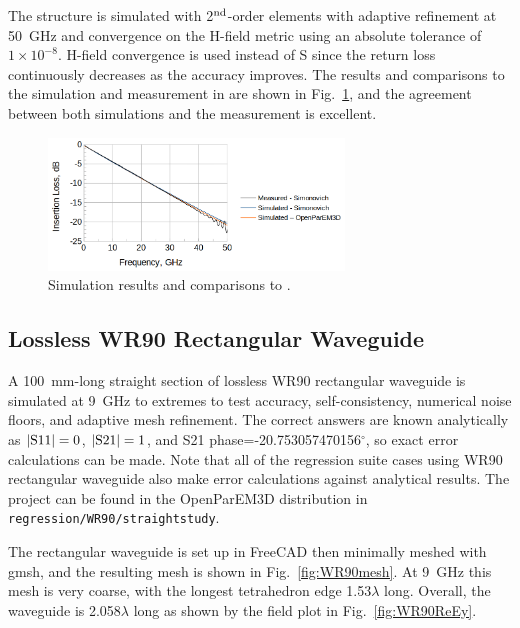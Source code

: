 \documentclass[titlepage]{article}
\renewcommand\_{\textunderscore\linebreak[1]}
\begin{document}
The structure is simulated with 2$^{\textnormal{nd}}$-order elements with adaptive refinement at 50~GHz and convergence on the H-field metric using an absolute tolerance of $1\!\!\times\!\!10^{-8}$.  H-field convergence is used instead of S since the return loss continuously decreases as the accuracy improves.  The results and comparisons to the simulation and measurement in \cite{Simonovich} are shown in Fig.~\ref{fig:stripline_results}, and the agreement between both simulations and the measurement is excellent.

\begin{figure}[H]
  \centering
  \includegraphics[width=0.7\textwidth]{../regression/OpenParEM3D/stripline/Simonovich_stripline_study/screenshots/stripline_results}
  \caption{Simulation results and comparisons to \cite{Simonovich}.}
  \label{fig:stripline_results}
\end{figure}

\subsection{Lossless WR90 Rectangular Waveguide}

A 100~mm-long straight section of lossless WR90 rectangular waveguide is simulated at 9~GHz to extremes to test accuracy, self-consistency, numerical noise floors, and adaptive mesh refinement.  The correct answers are known analytically as $|\textnormal{S11}|=0$, $|\textnormal{S21}|=1$, and S21 phase=-20.753057470156$^\circ$, so exact error calculations can be made.  Note that all of the regression suite cases using WR90 rectangular waveguide also make error calculations against analytical results.  The project can be found in the OpenParEM3D distribution in \texttt{regression/WR90/straight\_study}.

The rectangular waveguide is set up in FreeCAD then minimally meshed with gmsh, and the resulting mesh is shown in Fig.~\ref{fig:WR90mesh}.  At 9~GHz this mesh is very coarse, with the longest tetrahedron edge 1.53$\lambda$ long.  Overall, the waveguide is 2.058$\lambda$ long as shown by the field plot in Fig.~\ref{fig:WR90ReEy}.
\end{document}

